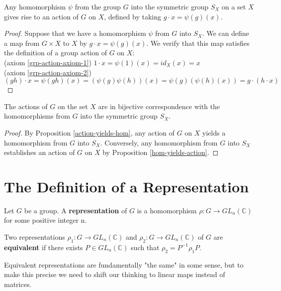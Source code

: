 \begin{prop} \label{hom-yields-action}
Any homomorphism $\psi$ from the group $G$ into the symmetric group $S_X$ on a set $X$ gives rise to an action of $G$ on $X$, defined by taking $g \cdot x = \psi(g)(x)$.
\end{prop}
\begin{proof}
Suppose  that we have a homomorphism $\psi$ from $G$ into $S_X$.  We can define a map from $G \times X$ to $X$  by $g \cdot x = \psi(g)(x)$. We verify that this map satisfies the definition of a group action of $G$ on $X$:
\\ (axiom \ref{grp-action-axiom-1}) \quad $1 \cdot x = \psi(1)(x) = id_X(x) = x$
\\(axiom \ref{grp-action-axiom-2}) \quad $(gh) \cdot x = \psi(gh)(x) = (\psi(g)\psi(h))(x) = \psi(g)(\psi(h)(x)) = g \cdot (h \cdot x)$
\end{proof}

\begin{cor} \label{equivalence-of-actions}
The actions of $G$ on the set $X$ are in bijective correspondence with the homomorphisms from $G$ into the symmetric group $S_X$.
\end{cor}
\begin{proof}
By Proposition \ref{action-yields-hom}, any action of $G$ on $X$ yields a homomorphism from $G$ into $S_X$.    Conversely, any homomorphism from $G$ into $S_X$ establishes an action of $G$ on $X$ by Proposition \ref{hom-yields-action}.
\end{proof}


%
\section{The Definition of a Representation}
\begin{defn}
Let $G$ be a group.  A \textbf{representation} of $G$ is a homomorphism $\rho \colon  G \to GL_n (\mathbb{C})$ for some positive integer n.
\end{defn}

\begin{defn}
Two representations $\rho_1 \colon  G \to GL_n (\mathbb{C})$  and $\rho_2 \colon  G \to GL_n (\mathbb{C})$ of $G$ are \textbf{equivalent} if there exists $P \in GL_n (\mathbb{C})$ such that $\rho_2 = P^{-1} \rho_1 P$.
\end{defn}
Equivalent representations are fundamentally "the same" in some sense, but to make this precise we need to shift our thinking to linear maps instead of matrices.

